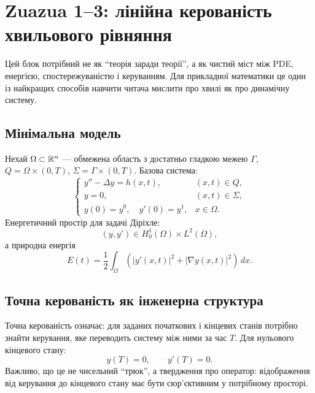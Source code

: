 \chapter{Zuazua 1--3: лінійна керованість хвильового рівняння}
\label{chap:zuazua-1-3}


Цей блок потрібний не як ``теорія заради теорії'', а як чистий міст між PDE, енергією, спостережуваністю і керуванням. Для прикладної математики це один із найкращих способів навчити читача мислити про хвилі як про динамічну систему.

\section{Мінімальна модель}

Нехай $\Omega\subset\mathbb{R}^n$ --- обмежена область з достатньо гладкою межею $\Gamma$, $Q=\Omega\times(0,T)$, $\Sigma=\Gamma\times(0,T)$. Базова система:
\begin{equation}
\begin{cases}
 y''-\Delta y = h(x,t), & (x,t)\in Q,\\
 y=0, & (x,t)\in\Sigma,\\
 y(0)=y^0,\quad y'(0)=y^1, & x\in\Omega.
\end{cases}
\end{equation}
Енергетичний простір для задачі Діріхле:
\begin{equation}
  (y,y')\in H_0^1(\Omega)\times L^2(\Omega),
\end{equation}
а природна енергія
\begin{equation}
  E(t)=\frac12\int_\Omega \left(|y'(x,t)|^2+|\nabla y(x,t)|^2\right)\,dx.
\end{equation}

\section{Точна керованість як інженерна структура}

Точна керованість означає: для заданих початкових і кінцевих станів потрібно знайти керування, яке переводить систему між ними за час $T$. Для нульового кінцевого стану:
\begin{equation}
  y(T)=0,\qquad y'(T)=0.
\end{equation}
Важливо, що це не чисельний ``трюк'', а твердження про оператор: відображення від керування до кінцевого стану має бути сюр'єктивним у потрібному просторі.

